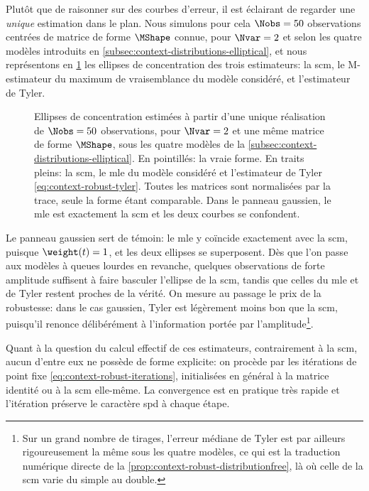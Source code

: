 Plutôt que de raisonner sur des courbes d'erreur, il est éclairant de regarder une \emph{unique} estimation dans le plan. Nous simulons pour cela $\Nobs=50$ observations centrées de matrice de forme $\MShape$ connue, pour $\Nvar=2$ et selon les quatre modèles introduits en \cref{subsec:context-distributions-elliptical}, et nous représentons en \cref{fig:context-robust-scmvstyler} les ellipses de concentration des trois estimateurs: la scm, le M-estimateur du maximum de vraisemblance du modèle considéré, et l'estimateur de Tyler.

\begin{figure}[h]
  \begin{center}
    
  \end{center}
  \provScmvstylerQR[.5cm]
  \caption{Ellipses de concentration estimées à partir d'une unique réalisation de $\Nobs=50$ observations, pour $\Nvar=2$ et une même matrice de forme $\MShape$, sous les quatre modèles de la \cref{subsec:context-distributions-elliptical}. En pointillés: la vraie forme. En traits pleins: la scm, le mle du modèle considéré et l'estimateur de Tyler \cref{eq:context-robust-tyler}. Toutes les matrices sont normalisées par la trace, seule la forme étant comparable. Dans le panneau gaussien, le mle est exactement la scm et les deux courbes se confondent. \provScmvstyler}
  \label{fig:context-robust-scmvstyler}
\end{figure}


Le panneau gaussien sert de témoin: le mle y coïncide exactement avec la scm, puisque $\weight(t)=1$, et les deux ellipses se superposent. Dès que l'on passe aux modèles à queues lourdes en revanche, quelques observations de forte amplitude suffisent à faire basculer l'ellipse de la scm, tandis que celles du mle et de Tyler restent proches de la vérité. On mesure au passage le prix de la robustesse: dans le cas gaussien, Tyler est légèrement moins bon que la scm, puisqu'il renonce délibérément à l'information portée par l'amplitude\footnote{Sur un grand nombre de tirages, l'erreur médiane de Tyler est par ailleurs rigoureusement la même sous les quatre modèles, ce qui est la traduction numérique directe de la \cref{prop:context-robust-distributionfree}, là où celle de la scm varie du simple au double.}.



Quant à la question du calcul effectif de ces estimateurs, contrairement à la scm, aucun d'entre eux ne possède de forme explicite: on procède par les itérations de point fixe \cref{eq:context-robust-iterations}, initialisées en général à la matrice identité ou à la scm elle-même. La convergence est en pratique très rapide et l'itération préserve le caractère spd à chaque étape. \\



